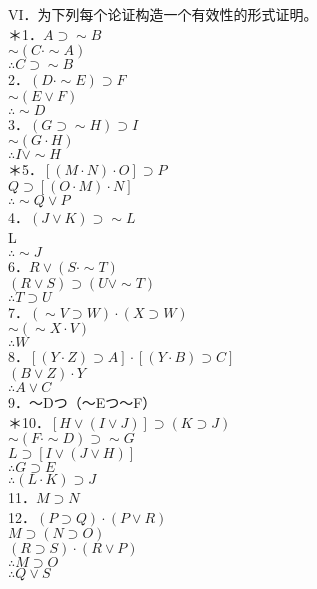 VI．为下列每个论证构造一个有效性的形式证明。\\
＊1．$A \supset \sim B$\\
$\sim(C \cdot \sim A)$\\
$\therefore C \supset \sim B$\\
2．$(D \cdot \sim E) \supset F$\\
$\sim(E \vee F)$\\
$\therefore \sim D$\\
3．$(G \supset \sim H) \supset I$\\
$\sim(G \cdot H)$\\
$\therefore I \vee \sim H$\\
＊5．$[(M \cdot N) \cdot O] \supset P$\\
$Q \supset[(O \cdot M) \cdot N]$\\
$\therefore \sim Q \vee P$\\
4．$(J \vee K) \supset \sim L$\\
L\\
$\therefore \sim J$\\
6．$R \vee(S \cdot \sim T)$\\
$(R \vee S) \supset(U \vee \sim T)$\\
$\therefore T \supset U$\\
7．$(\sim V \supset W) \cdot(X \supset W)$\\
$\sim(\sim X \cdot V)$\\
$\therefore W$\\
8．$[(Y \cdot Z) \supset A] \cdot[(Y \cdot B) \supset C]$\\
$(B \vee Z) \cdot Y$\\
$\therefore A \vee C$\\
9．～Dつ（～Eつ～F）\\
＊10．$[H \vee(I \vee J)] \supset(K \supset J)$\\
$\sim(F \cdot \sim D) \supset \sim G$\\
$L \supset[I \vee(J \vee H)]$\\
$\therefore G \supset E$\\
$\therefore(L \cdot K) \supset J$\\
11．$M \supset N$\\
12．$(P \supset Q) \cdot(P \vee R)$\\
$M \supset(N \supset O)$\\
$(R \supset S) \cdot(R \vee P)$\\
$\therefore M \supset O$\\
$\therefore Q \vee S$\\
